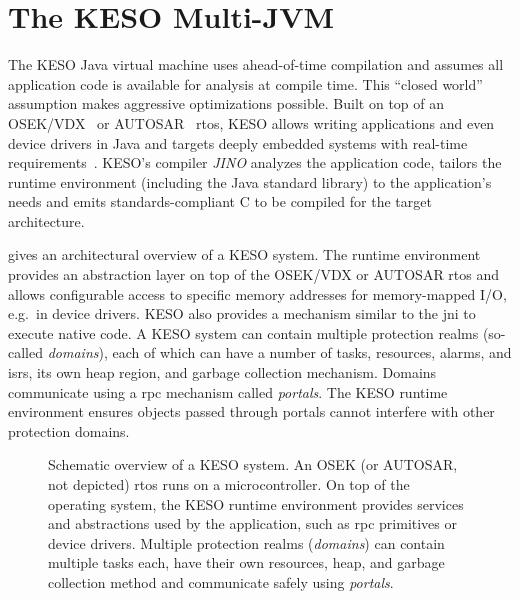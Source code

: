 	\section{The KESO Multi-JVM}
		\label{sec:intro:keso}
		The KESO Java virtual machine uses ahead-of-time compilation and assumes all application code is available for
		analysis at compile time. This \enquote{closed world} assumption makes aggressive optimizations possible. Built on
		top of an OSEK/VDX~\cite{OSEKSpec223} or AUTOSAR~\cite{autosar:06:sws_os} \gls{rtos}, KESO allows writing
		applications and even device drivers in Java and targets deeply embedded systems with real-time
		requirements~\cite{thomm:10:jtres}. KESO's compiler \emph{JINO} analyzes the application code, tailors the runtime
		environment (including the Java standard library) to the application's needs and emits standards-compliant C to be
		compiled for the target architecture.

		 gives an architectural overview of a KESO system. The runtime environment provides an
		abstraction layer on top of the OSEK/VDX or AUTOSAR \gls{rtos} and allows configurable access to specific memory
		addresses for memory-mapped I/O, e.g.\ in device drivers. KESO also provides a mechanism similar to the \gls{jni} to
		execute native code. A KESO system can contain multiple protection realms (so-called \emph{domains}), each of which
		can have a number of tasks, resources, alarms, and \glspl{isr}, its own heap region, and garbage collection
		mechanism. Domains communicate using a \gls{rpc} mechanism called \emph{portals}. The KESO runtime environment
		ensures objects passed through portals cannot interfere with other protection domains.

		\begin{figure}
			\begin{center}
				
			\end{center}
			\caption[Schematic overview of a KESO system]{%
				Schematic overview of a KESO system. An OSEK (or AUTOSAR, not depicted) \gls{rtos} runs on a microcontroller. On
				top of the operating system, the KESO runtime environment provides services and abstractions used by the
				application, such as \gls{rpc} primitives or device drivers. Multiple protection realms (\emph{domains}) can
				contain multiple tasks each, have their own resources, heap, and garbage collection method and communicate
				safely using \emph{portals}.}
			\label{fig:intro:overview}
		\end{figure}

